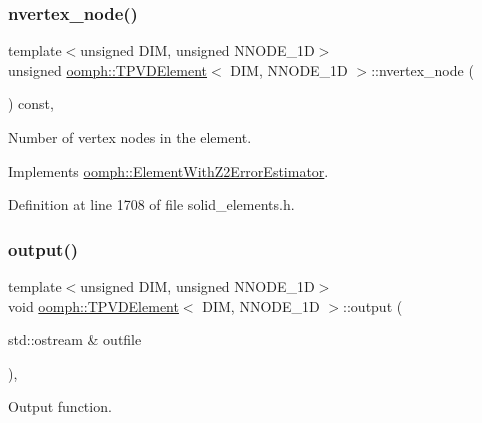 \subsubsection{\texorpdfstring{nvertex\+\_\+node()}{nvertex\_node()}}
{\footnotesize\ttfamily template$<$unsigned D\+IM, unsigned N\+N\+O\+D\+E\+\_\+1D$>$ \\
unsigned \hyperlink{classoomph_1_1TPVDElement}{oomph\+::\+T\+P\+V\+D\+Element}$<$ D\+IM, N\+N\+O\+D\+E\+\_\+1D $>$\+::nvertex\+\_\+node (\begin{DoxyParamCaption}{ }\end{DoxyParamCaption}) const\hspace{0.3cm}{\ttfamily [inline]}, {\ttfamily [virtual]}}



Number of vertex nodes in the element. 



Implements \hyperlink{classoomph_1_1ElementWithZ2ErrorEstimator_a19495a0e77ef4ff35f15fdf7913b4077}{oomph\+::\+Element\+With\+Z2\+Error\+Estimator}.



Definition at line 1708 of file solid\+\_\+elements.\+h.

\mbox{\label{classoomph_1_1TPVDElement_a048f0db11c13863fadc1606483c5a5e2}} 
\subsubsection{\texorpdfstring{output()}{output()}\hspace{0.1cm}{\footnotesize\ttfamily [1/4]}}
{\footnotesize\ttfamily template$<$unsigned D\+IM, unsigned N\+N\+O\+D\+E\+\_\+1D$>$ \\
void \hyperlink{classoomph_1_1TPVDElement}{oomph\+::\+T\+P\+V\+D\+Element}$<$ D\+IM, N\+N\+O\+D\+E\+\_\+1D $>$\+::output (\begin{DoxyParamCaption}\item[{std\+::ostream \&}]{outfile }\end{DoxyParamCaption})\hspace{0.3cm}{\ttfamily [inline]}, {\ttfamily [virtual]}}



Output function. 



